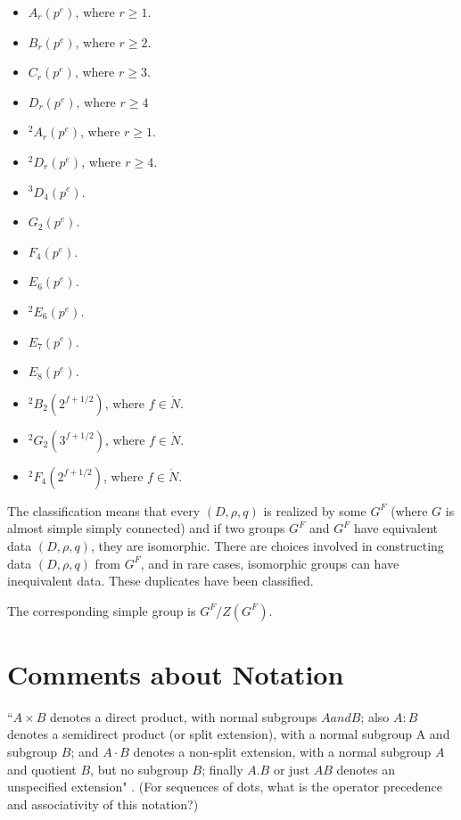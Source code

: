 \begin{itemize}
\item $A_r(p^e)$, where $r\ge 1$.
\item $B_r(p^e)$, where $r\ge 2$.
\item $C_r(p^e)$, where $r\ge 3$.
\item $D_r(p^e)$, where $r\ge 4$
\item ${}^2A_r(p^e)$, where $r\ge 1$.
\item ${}^2D_r(p^e)$, where $r\ge 4$.
\item ${}^3D_4(p^e)$.
\item $G_2(p^e)$.
\item $F_4(p^e)$.
\item $E_6(p^e)$.
\item ${}^2E_6(p^e)$.
\item $E_7(p^e)$.
\item $E_8(p^e)$.
\item ${}^2B_2(2^{f+1/2})$, where $f\in\ring{N}$.
\item ${}^2G_2(3^{f+1/2})$, where $f\in\ring{N}$.
\item ${}^2F_4(2^{f+1/2})$, where $f\in\ring{N}$.
\end{itemize}



The classification means that every $(D,\rho,q)$ is realized by some
$G^F$ (where $G$ is almost simple simply connected) and if two groups
$G^F$ and $G^F$ have equivalent data $(D,\rho,q)$, they are
isomorphic.  There are choices involved in constructing data
$(D,\rho,q)$ from $G^F$, and in rare cases, isomorphic groups can have
inequivalent data.  These duplicates have been classified.

The corresponding simple group is $G^F/Z(G^F)$.


\section{Comments about Notation}

``$A \times B$ denotes a direct product, with normal subgroups $A and
B$; also $A:B$ denotes a semidirect product (or split extension), with
a normal subgroup A and subgroup $B$; and $A \cdot B$ denotes a
non-split extension, with a normal subgroup $A$ and quotient $B$, but
no subgroup $B$; finally $A.B$ or just $AB$ denotes an unspecified
extension" \cite[p.9]{wilson2009finite}. (For sequences of dots, what
is the operator precedence and associativity of this notation?)

